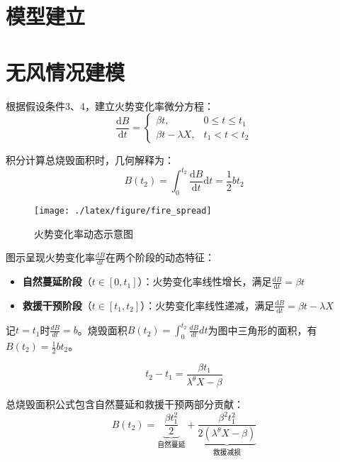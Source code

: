 \section{模型建立}
\section*{无风情况建模}
根据假设条件3、4，建立火势变化率微分方程：
\begin{equation}\label{eq:fire_rate}
    \frac{\mathrm{d}B}{\mathrm{d}t} = 
    \begin{cases}
        \beta t, & 0 \leq t \leq t_1 \\
        \beta t - \lambda X, & t_1 < t < t_2
    \end{cases}
\end{equation}

积分计算总烧毁面积时，几何解释为：
\begin{equation}\label{eq:area_integral}
    B(t_{2}) = \int_{0}^{t_{2}} \frac{\mathrm{d}B}{\mathrm{d}t}\mathrm{d}t = \frac{1}{2}bt_{2}
\end{equation}

\begin{center}
\begin{figure}[H]
    \centering
    \texttt{[image: ./latex/figure/fire\_spread]}
    \caption{火势变化率动态示意图}
    \label{fig:fire_spread}
\end{figure}
\end{center}

图示呈现火势变化率$\frac{\mathrm{d}B}{\mathrm{d}t}$在两个阶段的动态特征：
\begin{itemize}[leftmargin=2em]
    \item \textbf{自然蔓延阶段}（$t \in [0, t_1]$）：火势变化率线性增长，满足$\frac{\mathrm{d}B}{\mathrm{d}t} = \beta t$
    \item \textbf{救援干预阶段}（$t \in [t_1, t_2]$）：火势变化率线性递减，满足$\frac{\mathrm{d}B}{\mathrm{d}t} = \beta t - \lambda X$
\end{itemize}

记$t = t_{1}$时$\frac{dB}{dt} = b$。烧毁面积$B(t_{2}) = \int_{0}^{t_{2}} \frac{dB}{dt}dt$为图中三角形的面积，有$B(t_{2}) = \frac{1}{2}bt_{2}$。

\begin{equation}\label{eq:time_relation}
    t_{2} - t_{1} = \frac{\beta t_{1}}{\lambda^{\theta}X - \beta}
\end{equation}

总烧毁面积公式包含自然蔓延和救援干预两部分贡献：
\begin{equation}\label{eq:total_area}
    B(t_{2}) = \underbrace{\frac{\beta t_{1}^{2}}{2}}_{\text{自然蔓延}} + \underbrace{\frac{\beta^{2} t_{1}^{2}}{2(\lambda^{\theta}X - \beta)}}_{\text{救援减损}}
\end{equation}

